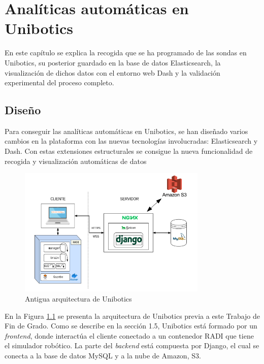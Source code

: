 \chapter{Analíticas automáticas en Unibotics}
\label{analiticas}
En este capítulo se explica la recogida que se ha programado de las sondas en Unibotics, su posterior guardado en la base de datos Elasticsearch, la visualización de dichos datos con el entorno web Dash y la validación experimental del proceso completo.

\section{Diseño}
Para conseguir las analíticas automáticas en Unibotics, se han diseñado varios cambios en la plataforma con las nuevas tecnologías involucradas: Elasticsearch y Dash. Con estas extensiones estructurales se consigue la nueva funcionalidad de recogida y visualización automáticas de datos \\

\begin{figure}[H]
    \centering
    \includegraphics[width=9cm, keepaspectratio]{img/grafico.png}
    \caption{Antigua arquitectura de Unibotics}
    \label{fig:grafico}
\end{figure}

En la Figura \ref{fig:grafico} se presenta la arquitectura de Unibotics previa a este Trabajo de Fin de Grado. Como se describe en la sección 1.5, Unibotics está formado por un \textit{frontend}, donde interactúa el cliente conectado a un contenedor RADI que tiene el simulador robótico. La parte del \textit{backend} está compuesta por Django, el cual se conecta a la base de datos MySQL y a la nube de Amazon, S3.

